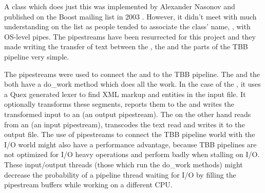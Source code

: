 A class which does just this was implemented by Alexander Nasonov and published
on the Boost mailing list in 2003 \cite{web-pipes}. However, it didn't meet
with much understanding on the list as people tended to associate the class'
name, , with OS-level pipes. The pipestreams have been resurrected
for this project and they made writing the transfer of text between the
, the  and the parts of the TBB pipeline
very simple.

The pipestreams were used to connect the  and
 to the TBB pipeline. The  and the
 both have a do\_\-work method which does all the work. In the
case of the , it uses a Quex generated lexer to find XML
markup and entities in the input file. It optionally transforms these
segments, reports them to the  and writes the
transformed input to an  (an output pipestream). The
 on the other hand reads from an  (an input
pipestream), transcodes the text read and writes it to the output file. The
use of pipestreams to connect the TBB pipeline world with the I/O world might
also have a performance advantage, because TBB pipelines are not optimized for
I/O heavy operations and perform badly when stalling on I/O. These
input/output threads (those which run the do\_\-work methods) might decrease
the probability of a pipeline thread waiting for I/O by filling the pipestream
buffers while working on a different CPU.
